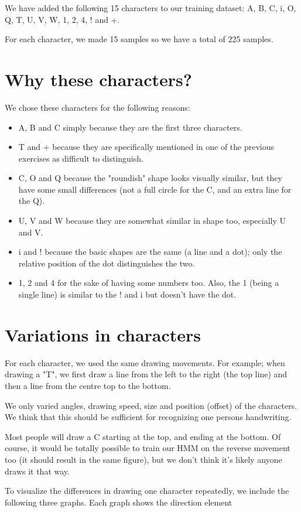 We have added the following 15 characters to our training dataset: A, B, C, i, O, Q, T, U, V, W, 1, 2, 4, ! and +.

For each character, we made 15 samples so we have a total of 225 samples.

\section{Why these characters?}
We chose these characters for the following reasons:
\begin{itemize}
\item A, B and C simply because they are the first three characters.
\item T and + because they are specifically mentioned in one of the previous exercises as difficult to distinguish.
\item C, O and Q because the "roundish" shape looks visually similar, but they have some small differences (not a full circle for the C, and an extra line for the Q).
\item U, V and W because they are somewhat similar in shape too, especially U and V.
\item i and ! because the basic shapes are the same (a line and a dot); only the relative position of the dot distinguishes the two.
\item 1, 2 and 4 for the sake of having some numbers too. Also, the 1 (being a single line) is similar to the ! and i but doesn't have the dot.
\end{itemize}

\section{Variations in characters}
For each character, we used the same drawing movements. For example; when drawing a "T", we first draw a line from the left to the right (the top line) and then a line from the centre top to the bottom.

We only varied angles, drawing speed, size and position (offset) of the characters. We think that this should be sufficient for recognizing one persons handwriting.

Most people will draw a C starting at the top, and ending at the bottom. Of course, it would be totally possible to train our HMM on the reverse movement too (it should result in the same figure), but we don't think it's likely anyone draws it that way.

To visualize the differences in drawing one character repeatedly, we include the following three graphs. Each graph shows the direction element 

